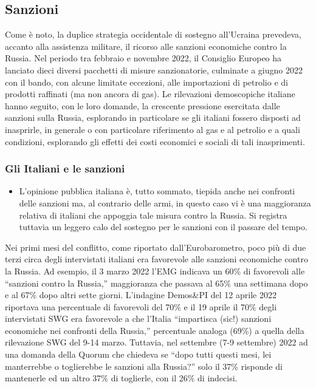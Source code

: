 \documentclass[
]{book}
\providecommand{\tightlist}{%
  \setlength{\itemsep}{0pt}\setlength{\parskip}{0pt}}
\begin{document}
\hypertarget{sanzioni}{%
\subsection{Sanzioni}\label{sanzioni}}

Come è noto, la duplice strategia occidentale di sostegno all'Ucraina prevedeva, accanto alla assistenza militare, il ricorso alle sanzioni economiche contro la Russia. Nel periodo tra febbraio e novembre 2022, il Consiglio Europeo ha lanciato dieci diversi pacchetti di misure sanzionatorie, culminate a giugno 2022 con il bando, con alcune limitate eccezioni, alle importazioni di petrolio e di prodotti raffinati (ma non ancora di gas). Le rilevazioni demoscopiche italiane hanno seguito, con le loro domande, la crescente pressione esercitata dalle sanzioni sulla Russia, esplorando in particolare se gli italiani fossero disposti ad inasprirle, in generale o con particolare riferimento al gas e al petrolio e a quali condizioni, esplorando gli effetti dei costi economici e sociali di tali inasprimenti.

\hypertarget{gli-italiani-e-le-sanzioni}{%
\subsubsection{Gli Italiani e le sanzioni}\label{gli-italiani-e-le-sanzioni}}

\begin{itemize}
\tightlist
\item
  L'opinione pubblica italiana è, tutto sommato, tiepida anche nei confronti delle sanzioni ma, al contrario delle armi, in questo caso vi è una maggioranza relativa di italiani che appoggia tale misura contro la Russia. Si registra tuttavia un leggero calo del sostegno per le sanzioni con il passare del tempo.
\end{itemize}

Nei primi mesi del conflitto, come riportato dall'Eurobarometro, poco più di due terzi circa degli intervistati italiani era favorevole alle sanzioni economiche contro la Russia. Ad esempio, il 3 marzo 2022 l'EMG indicava un 60\% di favorevoli alle ``sanzioni contro la Russia,'' maggioranza che passava al 65\% una settimana dopo e al 67\% dopo altri sette giorni. L'indagine Demos\&PI del 12 aprile 2022 riportava una percentuale di favorevoli del 70\% e il 19 aprile il 70\% degli intervistati SWG era favorevole a che l'Italia ``impartisca (sic!) sanzioni economiche nei confronti della Russia,'' percentuale analoga (69\%) a quella della rilevazione SWG del 9-14 marzo. Tuttavia, nel settembre (7-9 settembre) 2022 ad una domanda della Quorum che chiedeva se ``dopo tutti questi mesi, lei manterrebbe o toglierebbe le sanzioni alla Russia?'' solo il 37\% risponde di mantenerle ed un altro 37\% di toglierle, con il 26\% di indecisi.
\end{document}
